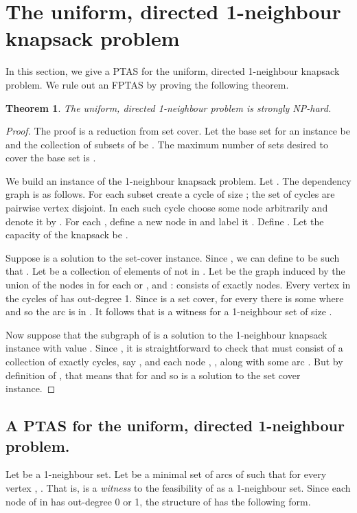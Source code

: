 \documentclass[12pt]{article}
\newtheorem{theorem}{Theorem}
\begin{document}
\section{The uniform, directed 1-neighbour knapsack problem} \label{sec:ud1n}

In this section, we give a PTAS for the uniform, directed 1-neighbour
knapsack problem.  We rule out an FPTAS by proving the following theorem.



\begin{theorem} \label{thm:ud1n-hard}
The uniform, directed 1-neighbour problem is strongly NP-hard.
\end{theorem}




\begin{proof}
The proof is a reduction from set cover.  Let the base set for an
instance be  and the collection of
subsets of  be .  The maximum
number of sets desired to cover the base set is .

We build an instance of the 1-neighbour knapsack problem.  Let .  The dependency graph is as follows.  For
each subset  create a cycle  of size ; the set of cycles are
pairwise vertex disjoint.  In each such cycle  choose some node
arbitrarily and denote it by .  For each , define a new
node in  and label it .  Define .   Let the capacity of the knapsack be .

Suppose  is a solution to the set-cover instance.  Since
, we can define  to be such that
.  Let  be a collection of  elements of  not in . Let  be the graph induced by the union of the nodes in
 for each  or , and :  consists of exactly  nodes.  Every vertex
in the cycles of  has out-degree 1.  Since  is a set
cover, for every  there is some  where
 and so the arc  is in .  It follows that
 is a witness for a 1-neighbour set of size .

Now suppose that the subgraph  of  is a solution to the
1-neighbour knapsack instance with value .  Since , it is straightforward to
check that  must consist of a collection  of exactly 
cycles, say , and
each node , , along with some arc
.  But by definition of , that means that  for  and so  is a solution to the set cover
instance.
\end{proof}


\subsection{A PTAS for the uniform, directed 1-neighbour problem.}
Let  be a 1-neighbour set.  Let  be a minimal set of arcs of
 such that for every vertex , .  That is,  is a
{\em witness} to the feasibility of  as a 1-neighbour set.  Since
each node of  in  has out-degree 0 or 1, the structure of
 has the following form.
\end{document}
